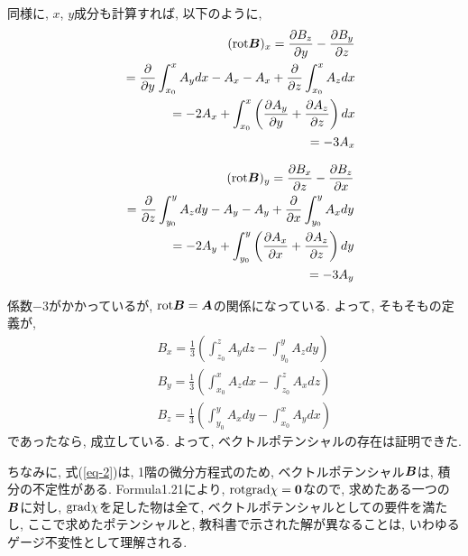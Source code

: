 \documentclass{jsarticle} \usepackage[dvipdfmx]{graphicx} \usepackage[dvipdfmx]{hyperref}
\newcommand*{\mbold}[1]{\mbox{\boldmath $#1$}}
\newcommand*{\grad}{{\rm grad}}
\newcommand*{\rot}{{\rm rot}}
\begin{document}
同様に, $x$, $y$成分も計算すれば, 以下のように,  
\begin{eqnarray*}
  && (\rot\mbold{B})_x = \frac{\partial B_z}{\partial y} - \frac{\partial B_y}{\partial z} \nonumber \\
  && = \frac{\partial}{\partial y}\int_{x_0}^x A_y dx - A_x 
    - A_x + \frac{\partial}{\partial z}\int_{x_0}^x A_z dx \nonumber \\
  && = -2 A_x + \int_{x_0}^x \left(\frac{\partial A_y}{\partial y} + \frac{\partial A_z}{\partial z}\right)dx \nonumber \\
  && = -3 A_x
\end{eqnarray*}

\begin{eqnarray*}
  && (\rot\mbold{B})_y = \frac{\partial B_x}{\partial z} - \frac{\partial B_z}{\partial x} \nonumber \\
  && = \frac{\partial}{\partial z}\int_{y_0}^y A_z dy - A_y 
    - A_y + \frac{\partial}{\partial x}\int_{y_0}^y A_x dy \nonumber \\
  && = -2 A_y + \int_{y_0}^y \left(\frac{\partial A_x}{\partial x} + \frac{\partial A_z}{\partial z}\right)dy \nonumber \\
  && = -3 A_y
\end{eqnarray*}

係数$-3$がかかっているが, $\rot\mbold{B} = \mbold{A}$の関係になっている. 
よって, そもそもの定義が, 
\begin{subequations}
  \begin{eqnarray}
    && B_x = \frac{1}{3}\left(\int_{z_0}^z A_y dz - \int_{y_0}^y A_z dy \right)  \\
    && B_y = \frac{1}{3}\left(\int_{x_0}^x A_z dx - \int_{z_0}^z A_x dz \right)  \\
    && B_z = \frac{1}{3}\left(\int_{y_0}^y A_x dy - \int_{x_0}^x A_y dx \right)
  \end{eqnarray}
\end{subequations}
であったなら, 成立している. 
よって, ベクトルポテンシャルの存在は証明できた. 

ちなみに, 式(\ref{eq-2})は, 1階の微分方程式のため, ベクトルポテンシャル$\mbold{B}$は, 積分の不定性がある. 
Formula1.21により, $\rot\grad\chi = \mbold{0}$なので, 求めたある一つの$\mbold{B}$に対し, $\grad\chi$を足した物は全て, ベクトルポテンシャルとしての要件を満たし, 
ここで求めたポテンシャルと, 教科書で示された解が異なることは, いわゆるゲージ不変性として理解される. 
\end{document}
